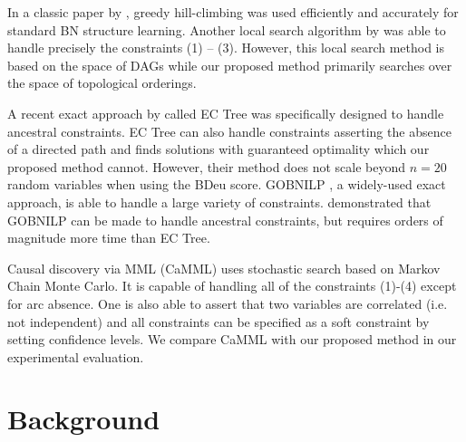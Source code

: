 \documentclass[twoside,11pt]{article}
\begin{document}
\smallskip
In a classic paper by \cite{Tsamardinos2006}, greedy hill-climbing was used efficiently and accurately for standard BN structure learning.
Another local search algorithm by \cite{CamposC07} was able to handle precisely the constraints (1) -- (3). However, this
local search method is based on the space of DAGs while our proposed method primarily searches
over the space of topological orderings.

\smallskip
A recent exact approach by \cite{Chen2016} called EC Tree was specifically designed to handle ancestral constraints. EC Tree can also handle constraints asserting
 the absence of a directed path and finds solutions with guaranteed optimality
which our proposed method cannot. However, their method does not scale beyond $n = 20$ random variables when using the BDeu score.
GOBNILP \citep{Bartlett2017}, a widely-used exact approach, is able to handle a large variety of
constraints. \cite{Chen2016} demonstrated that GOBNILP can be made to handle ancestral constraints, but requires orders of magnitude
more time than EC Tree.

\smallskip
Causal discovery via MML (CaMML) \citep{Korb2010} uses stochastic search based on Markov Chain Monte Carlo. 
It is capable of handling all of the constraints (1)-(4) except for arc absence. One is also able to
assert that two variables are correlated (i.e. not independent) and all constraints can be specified as a soft constraint by setting confidence levels. We
compare CaMML with our proposed method in our experimental evaluation. 

%
%
\section{Background}
\label{SECTION:Background}
\end{document}
